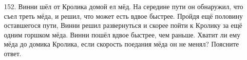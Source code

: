 152. Винни шёл от Кролика домой  ел мёд. На середине пути он обнаружил, что съел треть мёда, и решил, что может есть вдвое быстрее. Пройдя ещё половину оставшегося пути, Винни решил развернуться и скорее пойти к Кролику за ещё одним горшком мёда. Винни пошёл вдвое быстрее, чем раньше. Хватит ли ему мёда до домика Кролика, если скорость поедания мёда он не менял? Поясните ответ.\\
